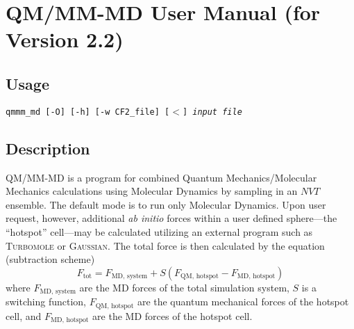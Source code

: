 \documentclass[12pt,a4paper]{article}
\newcommand{\CmdLine}[1]{\texttt{#1}}
\newcommand{\Latin}[1]{\textit{#1}}
\newcommand{\Program}[1]{\textsc{#1}}
\begin{document}
\section*{QM/MM-MD User Manual (for Version 2.2)}


\subsection*{Usage}

\hspace{0.1\columnwidth}\CmdLine{qmmm\_md [-O] [-h] [-w CF2\_file] [$<$]
  \itshape{input file}}


\subsection*{Description}

QM/MM-MD is a program for combined Quantum Mechanics/Molecular
Mechanics\cite{Sherwood:NIC-3-285,Maseras:JComputChem-16-9-1170,%
  Matsubara:JPhysChem-100-7-2573,Maseras:ChemCommun-25-1821,%
  Svensson:JPhysChem-100-50-19357,Dapprich:JMolStructTheoChem-461;462-1,%
  Bakowies:JPhysChem-100-25-10580,Sauer:JComputChem-21-16-1470,%
  Warshel:JMolBiol-103-227,Aqvist:ChemRev-93-7-2523,%
 Singh:JComputChem-7-6-718,Field:JComputChem-11-6-700,Gao:RevCompChem-7-119,%
 Gao:AccChemRes-29-6-298,Monard:AccChemRes-32-10-904} calculations using
Molecular Dynamics\cite{Allen:CompSimLiquid-1987,Frenkel:UnderMolSim-1996,%
  Rapaport:ArtMolDynSim-1997} by sampling in an $NVT$
ensemble\cite{McQuarrie:StatMech-1976}.  The default mode is to run only
Molecular Dynamics.  Upon user request, however, additional \Latin{ab initio}
forces within a user defined sphere---the ``hotspot''
cell\cite{Kerdcharoen:ChemPhys-211-313}---may be calculated utilizing an
external program such as
\Program{Turbomole}\cite{Ahlrichs:METECC-95,Ahlrichs:ChemPhysLett-162-3-165,%
  Brode:JComputChem-14-10-1142,Ahlrichs:BerBunsenPhysChem-102-6-795,%
  Arnim:JComputChem-19-15-1746} or \Program{Gaussian}\cite{GAUSSIAN98}.  The
total force is then calculated by the equation (subtraction
scheme\cite{Sherwood:NIC-3-285,Matsubara:JPhysChem-100-7-2573,%
  Svensson:JPhysChem-100-50-19357,Dapprich:JMolStructTheoChem-461;462-1})
\begin{equation}
  \label{eq:force}
  F_{\text{tot}} = F_{\text{MD, system}} + S (F_{\text{QM, hotspot}} -
  F_{\text{MD, hotspot}})
\end{equation}
where $F_{\text{MD, system}}$ are the MD forces of the total simulation system,
$S$ is a switching function\cite{Stillinger:JChemPhys-60-4-1545}, $F_{\text{QM,
    hotspot}}$ are the quantum mechanical forces of the hotspot cell, and
$F_{\text{MD, hotspot}}$ are the MD forces of the hotspot cell.
\end{document}
